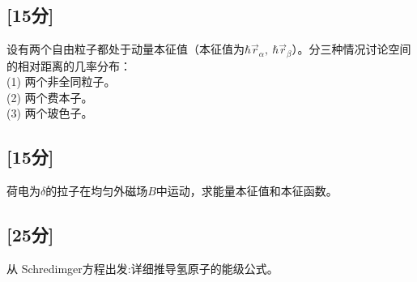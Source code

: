 \subsection{[15分]}
设有两个自由粒子都处于动量本征值（本征值为$\hbar \vec{r}_\alpha, \ \hbar \vec{r}_\beta$）。分三种情况讨论空间的相对距离的几率分布：\\
(1) 两个非全同粒子。\\
(2) 两个费本子。\\
(3) 两个玻色子。

\subsection{[15分]}
荷电为$\delta$的拉子在均匀外磁场$B$中运动，求能量本征值和本征函数。

\subsection{[25分]}
从 Schredimger方程出发:详细推导氢原子的能级公式。